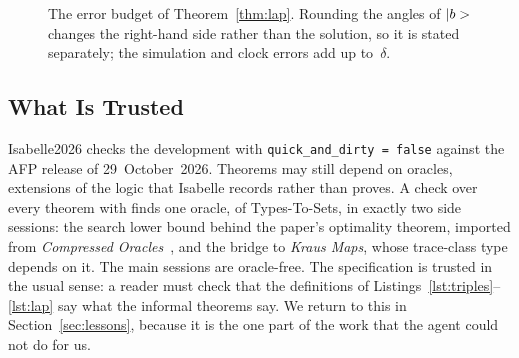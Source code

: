 \begin{figure}[t]
\centering
{}
\caption{The error budget of Theorem~\ref{thm:lap}. Rounding the angles of $|b>$ changes the
right-hand side rather than the solution, so it is stated separately; the simulation and clock errors
add up to~$\delta$.}\label{fig:budget}
\end{figure}

\subsection{What Is Trusted}\label{sec:trust}

Isabelle2026 checks the development with \texttt{quick\_and\_dirty = false} against the AFP release
of 29~October~2026. Theorems may still depend on oracles, extensions of the logic that Isabelle
records rather than proves. A check over every theorem with  finds one
oracle,  of Types-To-Sets, in exactly two side sessions: the search lower
bound behind the paper's optimality theorem, imported from \emph{Compressed
Oracles}~\cite{unruh2025co}, and the bridge to \emph{Kraus Maps}, whose trace-class type depends on
it. The main sessions are oracle-free. The specification is trusted in the usual sense: a reader must
check that the definitions of Listings~\ref{lst:triples}--\ref{lst:lap} say what the informal theorems
say. We return to this in Section~\ref{sec:lessons}, because it is the one part of the work that the
agent could not do for us.
